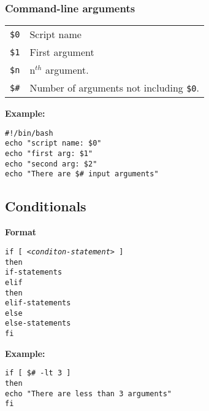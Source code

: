 \subsubsection{Command-line arguments}
\begin{tabularx}{\linewidth}{lX}
\texttt{\$0} & Script name\\
\texttt{\$1} & First argument\\
\texttt{\$n} & n$^{th}$ argument.\\
\texttt{\$\#} & Number of arguments not including \texttt{\$0}.\\
\end{tabularx}

\textbf{Example:}\\
\begin{mdframed}
\texttt{\#!/bin/bash}\\
\texttt{echo "script name: \$0"}\\
\texttt{echo "first arg: \$1"}\\
\texttt{echo "second arg: \$2"}\\
\texttt{echo "There are \$\# input arguments"}
\end{mdframed}

\subsection{Conditionals}
\textbf{Format}
\begin{mdframed}
\texttt{if [ \textit{<conditon-statement>} ]}\\
\texttt{then}\\
\texttt{if-statements}\\
\texttt{elif}\\
\texttt{then}\\
\texttt{elif-statements}\\
\texttt{else}\\
\texttt{else-statements}\\
\texttt{fi}
\end{mdframed}

\columnbreak
\vfill \null

\textbf{Example:}\\
\begin{mdframed}
\texttt{if [ \$\# -lt 3 ]}\\
\texttt{then}\\
\texttt{echo "There are less than 3 arguments"}\\
\texttt{fi}
\end{mdframed}

